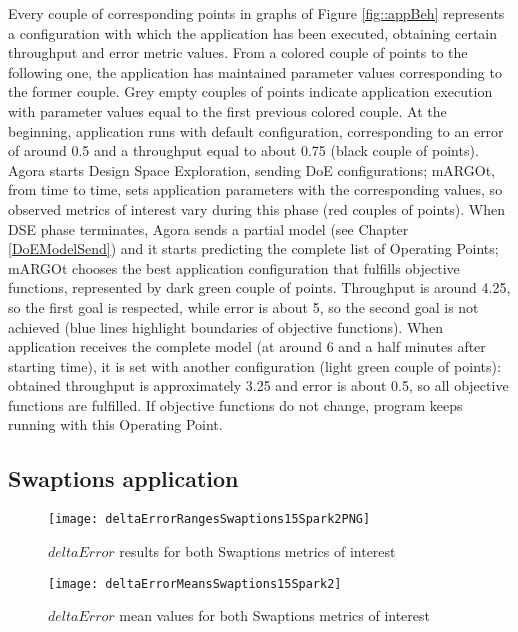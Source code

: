 Every couple of corresponding points in graphs of Figure \ref{fig::appBeh} represents a configuration with which the application has been executed, obtaining certain throughput and error metric values. From a colored couple of points to the following one, the application has maintained parameter values corresponding to the former couple. Grey empty couples of points indicate application execution with parameter values equal to the first previous colored couple. At the beginning, application runs with default configuration, corresponding to an error of around 0.5 and a throughput equal to about 0.75 (black couple of points). Agora starts Design Space Exploration, sending DoE configurations; mARGOt, from time to time, sets application parameters with the corresponding values, so observed metrics of interest vary during this phase (red couples of points). When DSE phase terminates, Agora sends a partial model (see Chapter \ref{DoEModelSend}) and it starts predicting the complete list of Operating Points; mARGOt chooses the best application configuration that fulfills objective functions, represented by dark green couple of points. Throughput is around 4.25, so the first goal is respected, while error is about 5, so the second goal is not achieved (blue lines highlight boundaries of objective functions). When application receives the complete model (at around 6 and a half minutes after starting time), it is set with another configuration (light green couple of points): obtained throughput is approximately 3.25 and error is about 0.5, so all objective functions are fulfilled. If objective functions do not change, program keeps running with this Operating Point.





\subsection{Swaptions application}

\begin{figure}[htb]

    \centering
    \texttt{[image: deltaErrorRangesSwaptions15Spark2PNG]}
    \caption{$deltaError$ results for both Swaptions metrics of interest}
    \label{fig::swaptions15spark2::intervals}
    
\end{figure}

\begin{figure}[htb]

    \centering
    \texttt{[image: deltaErrorMeansSwaptions15Spark2]}
    \caption{$deltaError$ mean values for both Swaptions metrics of interest}
    \label{fig::swaptions15spark2::means}
    
\end{figure}	

